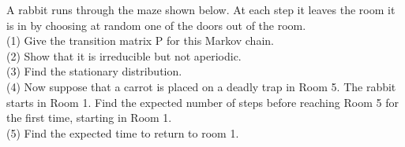 \documentclass[
	12pt, %
]{fphw}
\begin{document}
\begin{problem}
	\smallskip
	A rabbit runs through the maze shown below. At each step it leaves
	the room it is in by choosing at random one of the doors out of the room.\\
	(1) Give the transition matrix P for this Markov chain.\\
	(2) Show that it is irreducible but not aperiodic.\\
	(3) Find the stationary distribution.\\
	(4) Now suppose that a carrot is placed on a deadly trap in Room
	5. The rabbit starts in Room 1. Find the expected number
	of steps before reaching Room 5 for the first time, starting in Room 1.\\
	(5) Find the expected time to return to room 1.
	\smallskip
\end{problem}
\end{document}
